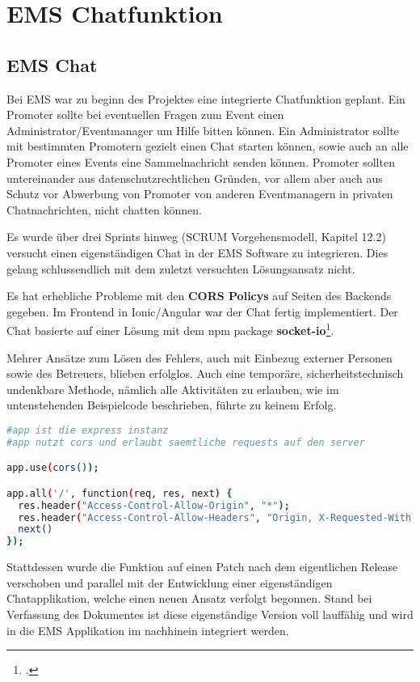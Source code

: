 \chapter{EMS Chatfunktion}
\putz
\section{EMS Chat}
Bei EMS war zu beginn des Projektes eine integrierte Chatfunktion geplant. Ein Promoter sollte bei eventuellen Fragen zum Event einen Administrator/Eventmanager um Hilfe bitten können.
Ein Administrator sollte mit bestimmten Promotern gezielt einen Chat starten können, sowie auch an alle Promoter eines Events eine Sammelnachricht senden können.
Promoter sollten untereinander aus datenschutzrechtlichen Gründen, vor allem aber auch
aus Schutz vor Abwerbung von Promoter von anderen Eventmanagern in privaten Chatnachrichten, nicht chatten können.

Es wurde über drei Sprints hinweg (SCRUM Vorgehensmodell, Kapitel 12.2) versucht einen eigenständigen Chat in der EMS Software zu integrieren. Dies gelang schlussendlich mit dem zuletzt versuchten Lösungsansatz nicht.

Es hat erhebliche Probleme mit den \textbf{CORS Policys} auf Seiten des Backends gegeben.
Im Frontend in Ionic/Angular war der Chat fertig implementiert. Der Chat basierte auf einer Lösung mit dem npm package \textbf{socket-io}\footcite{socket-io}.

Mehrer Ansätze zum Lösen des Fehlers, auch mit Einbezug externer Personen sowie des Betreuers, blieben erfolglos.
Auch eine temporäre, sicherheitstechnisch undenkbare Methode, nämlich alle Aktivitäten zu erlauben, wie im untenstehenden Beispielcode beschrieben, führte zu keinem Erfolg.

\begin{lstlisting}[language=bash]
#app ist die express instanz
#app nutzt cors und erlaubt saemtliche requests auf den server 

app.use(cors());

app.all('/', function(req, res, next) {
  res.header("Access-Control-Allow-Origin", "*");
  res.header("Access-Control-Allow-Headers", "Origin, X-Requested-With, Content-Type, Accept");
  next()
});
\end{lstlisting}

Stattdessen wurde die Funktion auf einen Patch nach dem eigentlichen Release verschoben und parallel mit der Entwicklung einer eigenständigen Chatapplikation, welche einen neuen Ansatz verfolgt begonnen.
Stand bei Verfassung des Dokumentes ist diese eigenständige Version voll lauffähig und wird in die EMS Applikation im nachhinein integriert werden.

